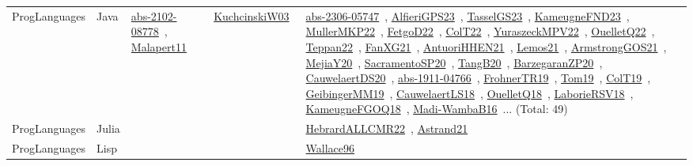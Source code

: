 {\begin{longtable}{lp{3cm}>{\raggedright\arraybackslash}p{6cm}>{\raggedright\arraybackslash}p{6cm}>{\raggedright\arraybackslash}p{8cm}}
ProgLanguages & Java & \href{works/abs-2102-08778.pdf}{abs-2102-08778}~\cite{abs-2102-08778}, \href{works/Malapert11.pdf}{Malapert11}~\cite{Malapert11} & \href{works/KuchcinskiW03.pdf}{KuchcinskiW03}~\cite{KuchcinskiW03} & \href{works/abs-2306-05747.pdf}{abs-2306-05747}~\cite{abs-2306-05747}, \href{works/AlfieriGPS23.pdf}{AlfieriGPS23}~\cite{AlfieriGPS23}, \href{works/TasselGS23.pdf}{TasselGS23}~\cite{TasselGS23}, \href{works/KameugneFND23.pdf}{KameugneFND23}~\cite{KameugneFND23}, \href{works/MullerMKP22.pdf}{MullerMKP22}~\cite{MullerMKP22}, \href{works/FetgoD22.pdf}{FetgoD22}~\cite{FetgoD22}, \href{works/ColT22.pdf}{ColT22}~\cite{ColT22}, \href{works/YuraszeckMPV22.pdf}{YuraszeckMPV22}~\cite{YuraszeckMPV22}, \href{works/OuelletQ22.pdf}{OuelletQ22}~\cite{OuelletQ22}, \href{works/Teppan22.pdf}{Teppan22}~\cite{Teppan22}, \href{works/FanXG21.pdf}{FanXG21}~\cite{FanXG21}, \href{works/AntuoriHHEN21.pdf}{AntuoriHHEN21}~\cite{AntuoriHHEN21}, \href{works/Lemos21.pdf}{Lemos21}~\cite{Lemos21}, \href{works/ArmstrongGOS21.pdf}{ArmstrongGOS21}~\cite{ArmstrongGOS21}, \href{works/MejiaY20.pdf}{MejiaY20}~\cite{MejiaY20}, \href{works/SacramentoSP20.pdf}{SacramentoSP20}~\cite{SacramentoSP20}, \href{works/TangB20.pdf}{TangB20}~\cite{TangB20}, \href{works/BarzegaranZP20.pdf}{BarzegaranZP20}~\cite{BarzegaranZP20}, \href{works/CauwelaertDS20.pdf}{CauwelaertDS20}~\cite{CauwelaertDS20}, \href{works/abs-1911-04766.pdf}{abs-1911-04766}~\cite{abs-1911-04766}, \href{works/FrohnerTR19.pdf}{FrohnerTR19}~\cite{FrohnerTR19}, \href{works/Tom19.pdf}{Tom19}~\cite{Tom19}, \href{works/ColT19.pdf}{ColT19}~\cite{ColT19}, \href{works/GeibingerMM19.pdf}{GeibingerMM19}~\cite{GeibingerMM19}, \href{works/CauwelaertLS18.pdf}{CauwelaertLS18}~\cite{CauwelaertLS18}, \href{works/OuelletQ18.pdf}{OuelletQ18}~\cite{OuelletQ18}, \href{works/LaborieRSV18.pdf}{LaborieRSV18}~\cite{LaborieRSV18}, \href{works/KameugneFGOQ18.pdf}{KameugneFGOQ18}~\cite{KameugneFGOQ18}, \href{works/Madi-WambaB16.pdf}{Madi-WambaB16}~\cite{Madi-WambaB16}... (Total: 49)\\
ProgLanguages & Julia &  &  & \href{works/HebrardALLCMR22.pdf}{HebrardALLCMR22}~\cite{HebrardALLCMR22}, \href{works/Astrand21.pdf}{Astrand21}~\cite{Astrand21}\\
ProgLanguages & Lisp &  &  & \href{works/Wallace96.pdf}{Wallace96}~\cite{Wallace96}\\

\end{longtable}}
